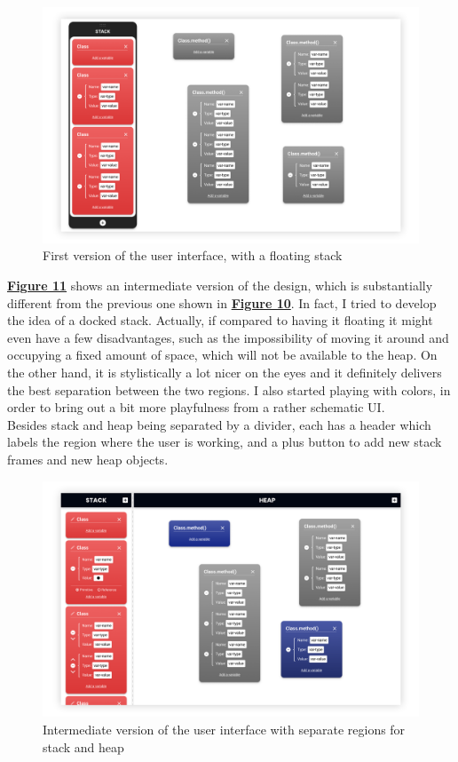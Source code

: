 \documentclass[]{usiinfbachelorproject}
\begin{document}
\begin{figure}[h!]
\centering
\includegraphics[width=\textwidth]{figures/floating_stack.png}
\caption {First version of the user interface, with a floating stack}
\label{floating stack}
\end{figure}

\pagebreak

\noindent \hyperref[separate regions]{\textbf{Figure 11}} shows an intermediate version of the design, which is substantially different from the previous one shown in \hyperref[floating stack]{\textbf{Figure 10}}. In fact, I tried to develop the idea of a docked stack. Actually, if compared to having it floating it might even have a few disadvantages, such as the impossibility of moving it around and occupying a fixed amount of space, which will not be available to the heap. On the other hand, it is stylistically a lot nicer on the eyes and it definitely delivers the best separation between the two regions. I also started playing with colors, in order to bring out a bit more playfulness from a rather schematic UI.\\
Besides stack and heap being separated by a divider, each has a header which labels the region where the user is working, and a plus button to add new stack frames and new heap objects.

\begin{figure}[h!]
\centering
\includegraphics[width=\textwidth]{figures/separate_regions.png}
\caption {Intermediate version of the user interface with separate regions for stack and heap}
\label{separate regions}
\end{figure}
\end{document}
